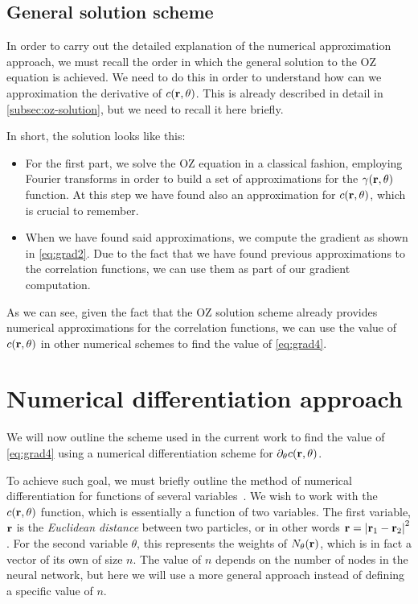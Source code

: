 \subsection{General solution scheme}
In order to carry out the detailed explanation of the numerical approximation approach,
we must recall the order in which the general solution to the OZ equation is achieved.
We need to do this in order to understand how can we approximation the derivative
of $c(\mathbf{r}, \theta)$.
This is already described in detail in \autoref{subsec:oz-solution}, but
we need to recall it here briefly.

In short, the solution looks like this:

\begin{itemize}
    \item For the first part, we solve the OZ equation in a classical fashion, employing Fourier transforms in order to build a set of approximations for the $\gamma(\mathbf{r}, \theta)$ function. At this step we have found also an approximation for $c(\mathbf{r}, \theta)$, which is crucial to remember.
    \item When we have found said approximations, we compute the gradient as shown in \autoref{eq:grad2}. Due to the fact that we have found previous approximations to the correlation functions, we can use them as part of our gradient computation.
\end{itemize}

As we can see, given the fact that the OZ solution scheme already provides numerical
approximations for the correlation functions, we can use the value of $c(\mathbf{r}, \theta)$
in other numerical schemes to find the value of \autoref{eq:grad4}.

\section{Numerical differentiation approach}
We will now outline the scheme used in the current work to find the value of 
\autoref{eq:grad4} using a numerical differentiation scheme for
$\partial_{\theta} c(\mathbf{r}, \theta)$.

To achieve such goal, we must briefly outline the method of numerical differentiation
for functions of several variables~\cite{hammingNumericalMethodsScientists2012}.
We wish to work with the $c(\mathbf{r}, \theta)$ function, which is essentially a function of
two variables. The first variable, $\mathbf{r}$ is the \emph{Euclidean distance}
between two particles, or in other words $\mathbf{r}={\lvert \mathbf{r}_1 - \mathbf{r}_2 \rvert}^2$.
For the second variable $\theta$, this represents the weights of $N_{\theta}(\mathbf{r})$, which is
in fact a vector of its own of size $n$. The value of $n$ depends on the number of
nodes in the neural network, but here we will use a more general approach instead of
defining a specific value of $n$.

